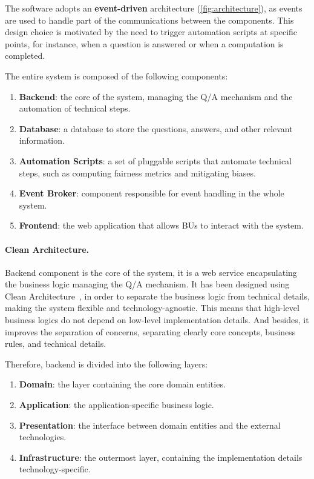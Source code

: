 \documentclass[12pt,a4paper,openright,twoside]{book}
\begin{document}
The software adopts an \textbf{event-driven} architecture (\cref{fig:architecture}), as events are used to handle part of the communications between the components.
%
This design choice is motivated by the need to trigger automation scripts at specific points, for instance, when a question is answered or when a computation is completed.

The entire system is composed of the following components:
\begin{enumerate}
    \item \textbf{Backend}: the core of the system, managing the \ac{Q/A} mechanism and the automation of technical steps.
    \item \textbf{Database}: a database to store the questions, answers, and other relevant information.
    \item \textbf{Automation Scripts}: a set of pluggable scripts that automate technical steps, such as computing fairness metrics and mitigating biases.
    \item \textbf{Event Broker}: component responsible for event handling in the whole system.
    \item \textbf{Frontend}: the web application that allows \acp{BU} to interact with the system.
\end{enumerate}

\paragraph{Clean Architecture.}

Backend component is the core of the system, it is a web service encapsulating the business logic managing the \ac{Q/A} mechanism.
%
It has been designed using Clean Architecture~\cite{martin2017clean}, in order to separate the business logic from technical details, making the system flexible and technology-agnostic.
%
This means that high-level business logics do not depend on low-level implementation details.
%
And besides, it improves the separation of concerns, separating clearly core concepts, business rules, and technical details.

Therefore, backend is divided into the following layers:

\begin{enumerate}
    \item \textbf{Domain}: the layer containing the core domain entities.
    \item \textbf{Application}: the application-specific business logic.
    \item \textbf{Presentation}: the interface between domain entities and the external technologies.
    \item \textbf{Infrastructure}: the outermost layer, containing the implementation details technology-specific.
\end{enumerate}
\end{document}
